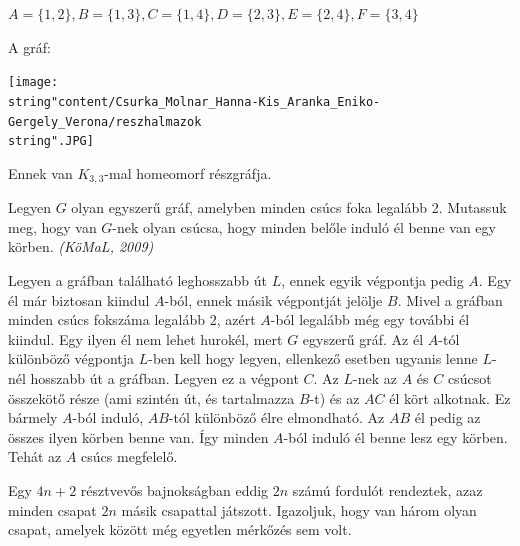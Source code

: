 \begin{solution}
	$A=\{1,2\},B=\{1,3\},C=\{1,4\},D=\{2,3\},E=\{2,4\},F=\{3,4\}$
	
	A gráf:
	
	\begin{center}
		\texttt{[image: \\string"content/Csurka\_Molnar\_Hanna-Kis\_Aranka\_Eniko-Gergely\_Verona/reszhalmazok\\string".JPG]}
	\end{center}
	
	Ennek van $K_{3,3}$-mal homeomorf részgráfja.
\end{solution}
\begin{extraproblem}
	Legyen $G$ olyan egyszerű gráf, amelyben minden csúcs foka legalább
	2. Mutassuk meg, hogy van $G$-nek olyan csúcsa, hogy minden belőle
	induló él benne van egy körben. \emph{(KöMaL, 2009) }
\end{extraproblem}

\begin{solution}
	Legyen a gráfban található leghosszabb út $L$, ennek egyik végpontja
	pedig $A$. Egy él már biztosan kiindul $A$-ból, ennek másik végpontját
	jelölje $B$. Mivel a gráfban minden csúcs fokszáma legalább $2$,
	azért $A$-ból legalább még egy további él kiindul. Egy ilyen él nem
	lehet hurokél, mert $G$ egyszerű gráf. Az él $A$-tól különböző végpontja
	$L$-ben kell hogy legyen, ellenkező esetben ugyanis lenne $L$-nél
	hosszabb út a gráfban. Legyen ez a végpont $C$. Az $L$-nek az $A$
	és $C$ csúcsot összekötő része (ami szintén út, és tartalmazza $B$-t)
	és az $AC$ él kört alkotnak. Ez bármely $A$-ból induló, $AB$-tól
	különböző élre elmondható. Az $AB$ él pedig az összes ilyen körben
	benne van. Így minden $A$-ból induló él benne lesz egy körben. Tehát
	az $A$ csúcs megfelelő. 
\end{solution}
\begin{extraproblem}
	Egy $4n+2$ résztvevős bajnokságban eddig $2n$ számú fordulót rendeztek,
	azaz minden csapat $2n$ másik csapattal játszott. Igazoljuk, hogy
	van három olyan csapat, amelyek között még egyetlen mérkőzés sem volt. 
\end{extraproblem}


